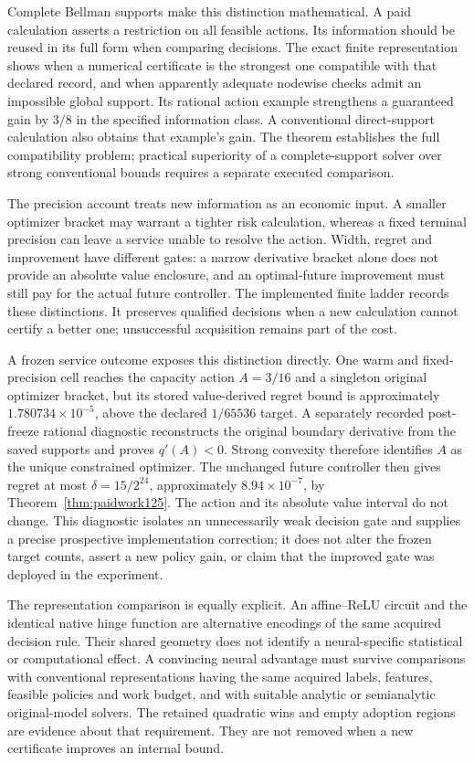 Complete Bellman supports make this distinction mathematical. A paid
calculation asserts a restriction on all feasible actions. Its information
should be reused in its full form when comparing decisions. The exact
finite representation shows when a numerical certificate is the strongest
one compatible with that declared record, and when apparently adequate
nodewise checks admit an impossible global support. Its rational action
example strengthens a guaranteed gain by $3/8$ in the specified
information class. A conventional direct-support calculation also obtains
that example's gain. The theorem establishes the full compatibility
problem; practical superiority of a complete-support solver over strong
conventional bounds requires a separate executed comparison.

The precision account treats new information as an economic input. A
smaller optimizer bracket may warrant a tighter risk calculation, whereas
a fixed terminal precision can leave a service unable to resolve the
action. Width, regret and improvement have different gates: a narrow
derivative bracket alone does not provide an absolute value enclosure,
and an optimal-future improvement must still pay for the actual future
controller. The implemented finite ladder records these distinctions.
It preserves qualified decisions when a new calculation cannot certify
a better one; unsuccessful acquisition remains part of the cost.


A frozen service outcome exposes this distinction directly. One warm
and fixed-precision cell reaches the capacity action $A=3/16$ and a
singleton original optimizer bracket, but its stored value-derived regret
bound is approximately $1.780734\times10^{-5}$, above the declared
$1/65536$ target. A separately recorded post-freeze rational diagnostic
reconstructs the original boundary derivative from the saved supports and
proves $q'(A)<0$. Strong convexity therefore identifies $A$ as the unique
constrained optimizer. The unchanged future controller then gives regret
at most $\delta=15/2^{24}$, approximately $8.94\times10^{-7}$, by
Theorem~\ref{thm:paidwork125}. The action and its absolute value interval
do not change. This diagnostic isolates an unnecessarily weak decision
gate and supplies a precise prospective implementation correction; it does
not alter the frozen target counts, assert a new policy gain, or claim
that the improved gate was deployed in the experiment.

The representation comparison is equally explicit. An affine--ReLU circuit
and the identical native hinge function are alternative encodings of the
same acquired decision rule. Their shared geometry does not identify a
neural-specific statistical or computational effect. A convincing neural
advantage must survive comparisons with conventional representations
having the same acquired labels, features, feasible policies and work
budget, and with suitable analytic or semianalytic original-model solvers.
The retained quadratic wins and empty adoption regions are evidence about
that requirement. They are not removed when a new certificate improves
an internal bound.

